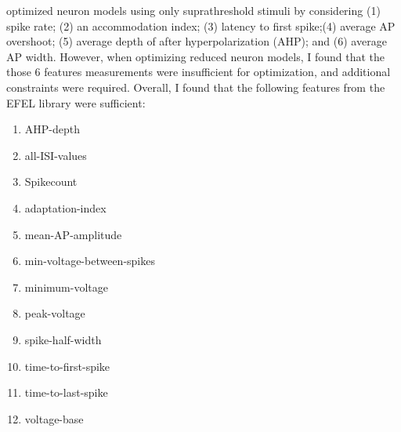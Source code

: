 \cite{druckmann2007novel} optimized neuron models using only suprathreshold stimuli by considering (1) spike rate; (2) an accommodation index; (3) latency to first spike;(4) average AP overshoot; (5) average depth of after hyperpolarization (AHP); and (6) average AP width.
However, when optimizing reduced neuron models, I found that the those 6 features measurements were insufficient for optimization, and additional constraints were required.
Overall, I found that the following features from the EFEL library were sufficient:
\begin{enumerate}
\item AHP-depth
\item all-ISI-values
\item Spikecount %
\item adaptation-index
\item mean-AP-amplitude
\item min-voltage-between-spikes
\item minimum-voltage
\item peak-voltage
\item spike-half-width
\item time-to-first-spike
\item time-to-last-spike
\item voltage-base
\end{enumerate}


